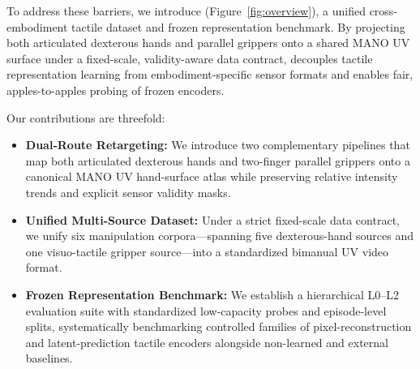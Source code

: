 To address these barriers, we introduce \bench{} (Figure~\ref{fig:overview}), a unified cross-embodiment tactile dataset and frozen representation benchmark.
By projecting both articulated dexterous hands and parallel grippers onto a shared MANO UV surface \citep{romero2017embodied} under a fixed-scale, validity-aware data contract, \bench{} decouples tactile representation learning from embodiment-specific sensor formats and enables fair, apples-to-apples probing of frozen encoders.

Our contributions are threefold:
\begin{itemize}[leftmargin=*,nosep]
    \item \textbf{Dual-Route Retargeting:} We introduce two complementary pipelines that map both articulated dexterous hands and two-finger parallel grippers onto a canonical MANO UV hand-surface atlas while preserving relative intensity trends and explicit sensor validity masks.
    \item \textbf{Unified Multi-Source Dataset:} Under a strict fixed-scale data contract, we unify six manipulation corpora---spanning five dexterous-hand sources and one visuo-tactile gripper source---into a standardized bimanual UV video format.
    \item \textbf{Frozen Representation Benchmark:} We establish a hierarchical L0--L2 evaluation suite with standardized low-capacity probes and episode-level splits, systematically benchmarking controlled families of pixel-reconstruction and latent-prediction tactile encoders alongside non-learned and external baselines.
\end{itemize}
